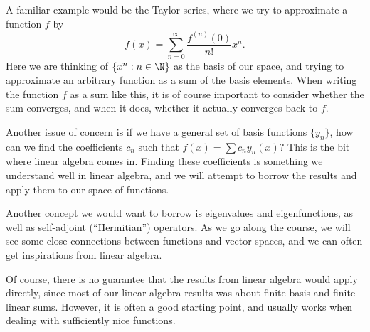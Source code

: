 \documentclass[a4paper]{article}
\begin{document}
A familiar example would be the Taylor series, where we try to approximate a function $f$ by
\[
  f(x) = \sum_{n = 0}^\infty \frac{f^{(n)}(0)}{n!} x^n.
\]
Here we are thinking of $\{x^n: n \in \N\}$ as the basis of our space, and trying to approximate an arbitrary function as a sum of the basis elements. When writing the function $f$ as a sum like this, it is of course important to consider whether the sum converges, and when it does, whether it actually converges back to $f$.

Another issue of concern is if we have a general set of basis functions $\{y_n\}$, how can we find the coefficients $c_n$ such that $f(x) = \sum c_n y_n(x)$? This is the bit where linear algebra comes in. Finding these coefficients is something we understand well in linear algebra, and we will attempt to borrow the results and apply them to our space of functions.

Another concept we would want to borrow is eigenvalues and eigenfunctions, as well as self-adjoint (``Hermitian'') operators. As we go along the course, we will see some close connections between functions and vector spaces, and we can often get inspirations from linear algebra.

Of course, there is no guarantee that the results from linear algebra would apply directly, since most of our linear algebra results was about finite basis and finite linear sums. However, it is often a good starting point, and usually works when dealing with sufficiently nice functions.
\end{document}
